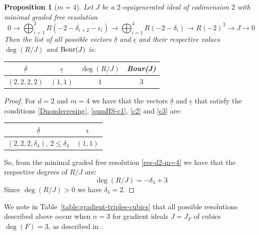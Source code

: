 \documentclass[11pt]{amsart} %
\newtheorem{Proposition}[Theorem]{Proposition}
\theoremstyle{definition}
\begin{document}
                    \begin{Proposition}[$m=4$]
				Let $J$ be a $2$-equigenerated ideal of codimension $2$ with minimal graded free resolution
			\begin{equation}\label{res-d2-m=4}
				0\to \bigoplus_{i=1}^2R(-2-\delta_{i+2}-\epsilon_i)\to \bigoplus_{i=1}^4 R(-2-\delta_i)\to R(-2)^3\to J\to 0
			\end{equation}
		Then the list of all possible vectors $\underline{\delta}$ and $\underline{\epsilon}$ and their respective values $\deg(R/J)$ and ${\rm Bour}(J)$ is:
	
			
			\begin{center}
				\begin{tabular}{|c|c|c|c|}
					\hline
			$\underline{\delta}$&$\underline{\epsilon}$&$\deg(R/J)$&{\rm Bour}(J)\\
					\hline
					$(2,2,2,2)$&$(1,1)$&$1$&$3$\\
					\hline
				\end{tabular}
			\end{center}
		
		\end{Proposition}
	\begin{proof}   For $d=2$ and $m=4$ we have that the vectors $\underline{\delta}$ and  $\underline{\epsilon}$ that  satisfy the conditions \eqref{Dnondecresing}, \eqref{sumHS-c1}, \eqref{c2} and \eqref{c3} are:
		
	
			\begin{center}
				\begin{tabular}{|c|c|}
					\hline
					$\underline{\delta}$&$\underline{\epsilon}$\\
					\hline
					$(2,2,2,\delta_4),\,2\leq \delta_4$&$(1,1)$\\
					\hline
				\end{tabular}
			\end{center}
		So, from  the minimal graded free resolution \eqref{res-d2-m=4} we have that the respective degrees  of $R/J$ are:
			\[\deg(R/J)=-\delta_4+3\]
			Since $\deg(R/J)>0$ we have $\delta_4=2.$
\end{proof}

We note in Table~\ref{table:gradient-triples-cubics} that all possible resolutions described above occur when $n=3$ for gradient ideals $J = J_F$ of cubics $\deg(F) = 3$, as described in \cite[Section 5]{Futata2023}:
\end{document}
